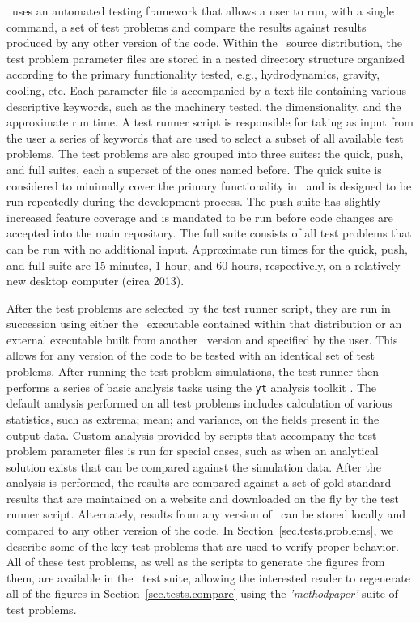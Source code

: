 \enzo\ uses an automated testing framework that allows a user to run,
with a single command, a set of test problems and compare the results
against results produced by any other version of the code.  Within the
\enzo\ source distribution, the test problem parameter files are stored
in a nested directory structure organized according to the primary
functionality tested, e.g., hydrodynamics, gravity, cooling, etc.
Each parameter file is accompanied by a text file containing various
descriptive keywords, such as the machinery tested, the
dimensionality, and the approximate run time.  A test runner script is
responsible for taking as input from the user a series of keywords
that are used to select a subset of all available test problems.  The
test problems are also grouped into three suites: the quick, push, and
full suites, each a superset of the ones named before.  The quick
suite is considered to minimally cover the primary functionality in
\enzo\ and is designed to be run repeatedly during the development
process.  The push suite has slightly increased feature coverage and
is mandated to be run before code changes are accepted into the main
repository.  The full suite consists of all test problems that can be
run with no additional input.  Approximate run times for the quick,
push, and full suite are 15 minutes, 1 hour, and 60 hours,
respectively, on a relatively new desktop computer (circa 2013).

After the test problems are selected by the test runner script, they
are run in succession using either the \enzo\ executable contained
within that distribution or an external executable built from another \enzo\
version and specified by the user.  This allows for any version of the
code to be tested with an identical set of test problems.  After
running the test problem simulations, the test runner then performs a
series of basic analysis tasks using the \texttt{yt} analysis toolkit
\citep{2011ApJS..192....9T, 2011arXiv1112.4482T}.  The default
analysis performed on all test problems includes calculation of
various statistics, such as extrema; mean; and variance, on the fields
present in the output data.  Custom analysis provided by scripts that
accompany the test problem parameter files is run for special cases,
such as when an analytical solution exists that can be compared
against the simulation data.  After the analysis is performed, the
results are compared against a set of gold standard results that are
maintained on a website and downloaded on the fly by the test runner
script.  Alternately, results from any version of \enzo\ can be stored
locally and compared to any other version of the code.  In
Section~\ref{sec.tests.problems}, we describe some of the key test
problems that are used to verify proper behavior.  All of these test
problems, as well as the scripts to generate the figures from them,
are available in the \enzo\ test suite, allowing the interested reader
to regenerate all of the figures in Section~\ref{sec.tests.compare}
using the \textit{'methodpaper'} suite of test problems.

